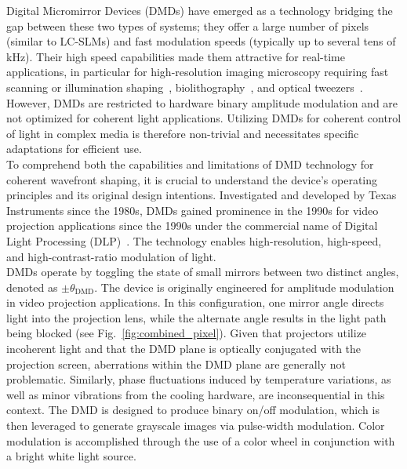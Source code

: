 \documentclass[12pt]{iopart}
\begin{document}
Digital Micromirror Devices (DMDs) have emerged as a technology bridging the gap
between these two types of systems;
they offer a large number of pixels (similar to LC-SLMs) and fast modulation speeds (typically up to several tens of kHz).
Their high speed capabilities made them attractive for real-time applications,
in particular for high-resolution imaging microscopy
requiring fast scanning or illumination shaping~\cite{Cha2000,Zhuang2020},
biolithography~\cite{yoon2018emerging},
and optical tweezers~\cite{Gauthier2016}.
However, DMDs are restricted to hardware binary amplitude modulation and are not optimized for coherent light applications.
Utilizing DMDs for coherent control of light in complex media is therefore non-trivial
and necessitates specific adaptations for efficient use.\\




To comprehend both the capabilities and limitations
of DMD technology for coherent wavefront shaping,
it is crucial to understand the device's operating principles
and its original design intentions.
Investigated and developed by Texas Instruments since the 1980s,
DMDs gained prominence in the 1990s for video projection applications since the 1990s
under the commercial name of Digital Light Processing (DLP)~\cite{Hornbeck1997,Dudley2003emerging}.
The technology enables high-resolution, high-speed, and high-contrast-ratio modulation of light.\\
DMDs operate by toggling the state of small mirrors between two distinct angles, denoted as $\pm \theta_\text{DMD}$.
The device is originally engineered for amplitude modulation in video projection applications.
In this configuration, one mirror angle directs light into the projection lens,
while the alternate angle results in the light path being blocked (see Fig.~\ref{fig:combined_pixel}).
Given that projectors utilize incoherent light and that the DMD plane is optically conjugated with the projection screen,
aberrations within the DMD plane are generally not problematic.
Similarly, phase fluctuations induced by temperature variations,
as well as minor vibrations from the cooling hardware, are inconsequential in this context.
The DMD is designed to produce binary on/off modulation,
which is then leveraged to generate grayscale images via pulse-width modulation.
Color modulation is accomplished through the use of a color wheel in conjunction with a bright white light source.\\
\end{document}
